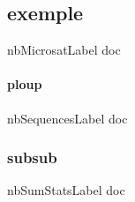 \documentclass[12pt,a4paper]{article}
\begin{document}
        \subsection{exemple}
        \label{doc_nbMicrosatLabel}
        nbMicrosatLabel doc
            \paragraph{ploup}
            \label{doc_nbSequencesLabel}
            nbSequencesLabel doc

            \subsubsection{subsub}
            \label{doc_nbSumStatsLabel}
            nbSumStatsLabel doc
\end{document}
